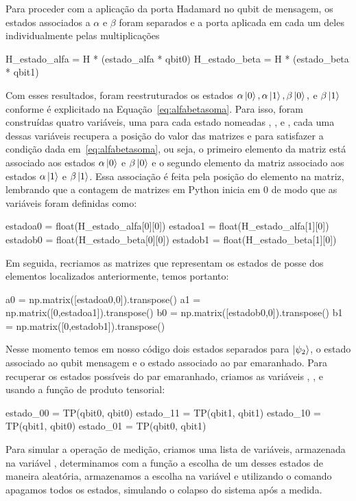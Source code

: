 Para proceder com a aplicação da porta Hadamard no qubit de mensagem, os estados associados a $\alpha$ e $\beta$ foram separados e a porta aplicada em cada um deles individualmente pelas multiplicações
\begin{pycode}
  H_estado_alfa = H * (estado_alfa * qbit0)
  H_estado_beta = H * (estado_beta * qbit1)
\end{pycode}
Com esses resultados, foram reestruturados os estados $\alpha\ket{0}, \alpha\ket{1}, \beta\ket{0},$ e $\beta\ket{1}$ conforme é explicitado na Equação~\eqref{eq:alfabetasoma}. Para isso, foram construídas quatro variáveis, uma para cada estado nomeadas , ,  e , cada uma dessas variáveis recupera a posição do valor das matrizes  e  para satisfazer a condição dada em~\eqref{eq:alfabetasoma}, ou seja, o primeiro elemento da matriz está associado aos estados $\alpha\ket{0}$ e $\beta\ket{0}$ e o segundo elemento da matriz associado aos estados $\alpha\ket{1}$ e $\beta\ket{1}$. Essa associação é feita pela posição do elemento na matriz, lembrando que a contagem de matrizes em Python inicia em 0 de modo que as variáveis foram definidas como:
\begin{pycode}
  estadoa0 = float(H_estado_alfa[0][0])
  estadoa1 = float(H_estado_alfa[1][0])
  estadob0 = float(H_estado_beta[0][0])
  estadob1 = float(H_estado_beta[1][0])
\end{pycode}
Em seguida, recriamos as matrizes que representam os estados de posse dos elementos localizados anteriormente, temos portanto:
\begin{pycode}
  a0 = np.matrix([estadoa0,0]).transpose()
  a1 = np.matrix([0,estadoa1]).transpose()
  b0 = np.matrix([estadob0,0]).transpose()
  b1 = np.matrix([0,estadob1]).transpose()
\end{pycode}
Nesse momento temos em nosso código dois estados separados para $\ket{\psi_2}$, o estado associado ao qubit mensagem e o estado associado ao par emaranhado. Para recuperar os estados possíveis do par emaranhado, criamos as variáveis , ,  e  usando a função de produto tensorial:
\begin{pycode}
  estado_00 = TP(qbit0, qbit0)
  estado_11 = TP(qbit1, qbit1)
  estado_10 = TP(qbit1, qbit0)
  estado_01 = TP(qbit0, qbit1)
\end{pycode}
Para simular a operação de medição, criamos uma lista de variáveis, armazenada na variável , determinamos com a função  a escolha de um desses estados de maneira aleatória, armazenamos a escolha na variável  e utilizando o comando  apagamos todos os estados, simulando o colapso do sistema após a medida.

